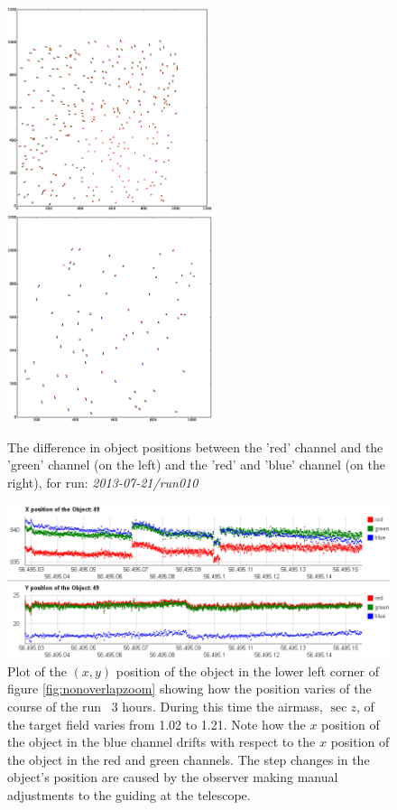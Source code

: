 \begin{figure}
  \centering
  \includegraphics[width=60mm]{images/objectOffset_run010_g.eps}
  \includegraphics[width=60mm]{images/objectOffset_run010_b.eps}
  \caption{The difference in object positions between the 'red' channel and the 'green' channel (on the left) and the 'red' and 'blue' channel (on the right), for run: \emph{2013-07-21/run010} }
\label{fig:greenblueoffset}
\end{figure}



\begin{figure}
  \centering
  \includegraphics[width=140mm]{images/position_drift.png}
  \caption{Plot of the $(x, y)$ position of the object in the lower left corner of figure \ref{fig:nonoverlapzoom} showing how the position varies of the course of the run ~3 hours. During this time the airmass, $\sec z$, of the target field varies from 1.02 to 1.21. Note how the $x$ position of the object in the blue channel drifts with respect to the $x$ position of the object in the red and green channels. The step changes in the object's position are caused by the observer making manual adjustments to the guiding at the telescope. }
\label{fig:positiondrift}
\end{figure}


